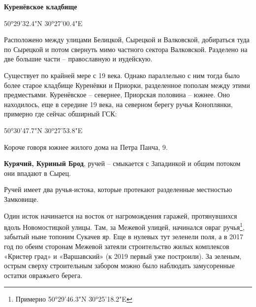 \medskip









\textbf{Куренёвское кладбище} 

50°29'32.4"N 30°27'00.4"E

Расположено между улицами Белицкой, Сырецкой и Валковской, добираться туда по Сырецкой и потом свернуть мимо частного сектора Валковской. Разделено на две большие части – православную и иудейскую. 

Существует по крайней мере с 19 века. Однако параллельно с ним тогда было более старое кладбище Куренёвки и Приорки, разделенное пополам между этими предместьями. Куренёвское – севернее, Приорская половина – южнее. Оно находилось, еще в середине 19 века, на северном берегу ручья Коноплянки, примерно где сейчас обширный ГСК:

50°30'47.7"N 30°27'53.8"E

Короче говоря южнее жилого дома на Петра Панча, 9.\\

\medskip


\textbf{Курячий, Куриный Брод}, ручей – смыкается с Западинкой и общим потоком они впадают в Сырец.

Ручей имеет два ручья-истока, которые протекают разделенные местностью Замковище. 

Один исток начинается на восток от нагромождения гаражей, протянувшихся вдоль Новомостицкой улицы. Там, за Межевой улицей,  начинался овраг ручья\footnote{Примерно 50°29'46.3"N 30°25'18.2"E}, забытый ныне топоним Сукачев яр. Еще в нулевых тут зеленели поля, а в 2017 год по обеим сторонам Межевой затеяли строительство жилых комплексов «Кристер град» и «Варшавский» (к 2019 первый уже построили). За зеленым, острым сверху строительным забором можно было наблюдать замусоренные остатки овражьего берега.


